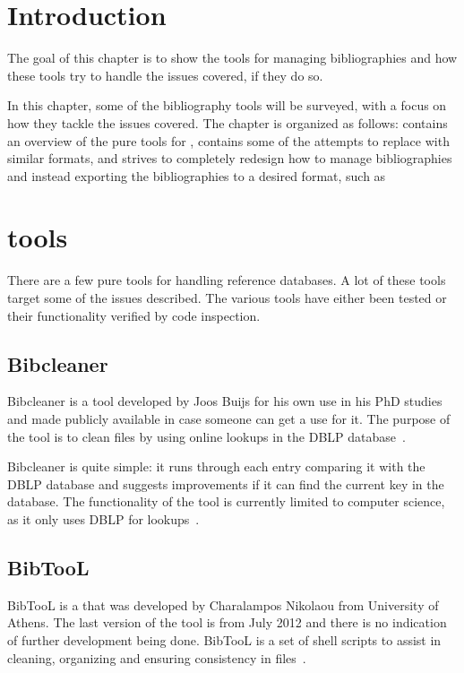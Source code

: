 \section{Introduction}
The goal of this chapter is to show the tools for managing
bibliographies and how these tools try to handle the issues covered,
if they do so.

In this chapter, some of the bibliography tools will be surveyed, with
a focus on how they tackle the issues covered.  The chapter is
organized as follows:  contains an overview
of the pure tools for {\bibtex}, 
contains some of the attempts to replace {\bibtex} with similar
formats, and  strives to completely
redesign how to manage bibliographies and instead exporting the
bibliographies to a desired format, such as {\bibtex}


\section{{\bibtex} tools}
\label{sec:bibtex_tools}
There are a few pure {\bibtex} tools for handling reference databases.
A lot of these tools target some of the issues described.  The
various tools have either been tested or their functionality verified
by code inspection.

\subsection{Bibcleaner}
Bibcleaner is a tool developed by Joos Buijs for his own use in his
PhD studies and made publicly available in case someone can get a use
for it.  The purpose of the tool is to clean {\bibtex} files by using
online lookups in the DBLP database~\cite{bibcleaner_question,
  bibcleaner_source}.

Bibcleaner is quite simple: it runs through each entry comparing it
with the DBLP database and suggests improvements if it can find the
current key in the database.  The functionality of the tool is
currently limited to computer science, as it only uses DBLP for
lookups~\cite{bibcleaner_source}.

\subsection{BibTooL}
BibTooL is a {\bibtex} that was developed by Charalampos Nikolaou from
University of Athens.  The last version of the tool is from July 2012
and there is no indication of further development being done.  BibTooL
is a set of shell scripts to assist in cleaning, organizing and
ensuring consistency in {\bibtex} files~\cite{bibtool_site}.

